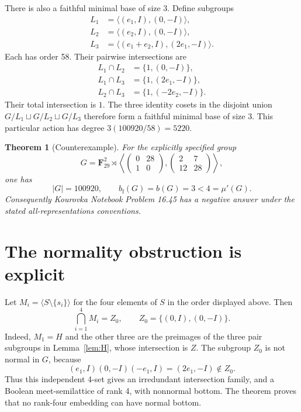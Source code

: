 \documentclass[11pt]{article}
\newtheorem{theorem}{Theorem}
\theoremstyle{remark}\newtheorem{remark}[theorem]{Remark}
\newcommand{\F}{\mathbf F}
\newcommand{\mup}{\mu'}
\newcommand{\bfth}{b_{\mathrm f}}
\begin{document}
There is also a faithful minimal base of size 3. Define subgroups
\[
\begin{split}
 L_1&=\langle(e_1,I),(0,-I)\rangle,\\
 L_2&=\langle(e_2,I),(0,-I)\rangle,\\
 L_3&=\langle(e_1+e_2,I),(2e_1,-I)\rangle.
\end{split}
\]
Each has order 58. Their pairwise intersections are
\[
\begin{split}
 L_1\cap L_2&=\{1,(0,-I)\},\\
 L_1\cap L_3&=\{1,(2e_1,-I)\},\\
 L_2\cap L_3&=\{1,(-2e_2,-I)\}.
\end{split}
\]
Their total intersection is $1$. The three identity cosets in the disjoint
union $G/L_1\sqcup G/L_2\sqcup G/L_3$ therefore form a faithful minimal base
of size 3. This particular action has degree $3(100920/58)=5220$.

\begin{theorem}[Counterexample]
For the explicitly specified group
\[
 G=\F_{29}^2\rtimes
 \left\langle
 \begin{pmatrix}0&28\\1&0\end{pmatrix},
 \begin{pmatrix}2&7\\12&28\end{pmatrix}
 \right\rangle,
\]
one has
\[
             |G|=100920,
 \qquad      \bfth(G)=b(G)=3<4=\mup(G).
\]
Consequently Kourovka Notebook Problem 16.45 has a negative answer under the
stated all-representations conventions.
\end{theorem}

\section{The normality obstruction is explicit}
Let $M_i=\langle S\setminus\{s_i\}\rangle$ for the four elements of $S$ in the
order displayed above. Then
\[
              \bigcap_{i=1}^4M_i=Z_0,
       \qquad Z_0=\{(0,I),(0,-I)\}.
\]
Indeed, $M_1=H$ and the other three are the preimages of the three pair
subgroups in Lemma~\ref{lem:H}, whose intersection is $Z$. The subgroup
$Z_0$ is not normal in $G$, because
\[
 (e_1,I)(0,-I)(-e_1,I)=(2e_1,-I)\notin Z_0.
\]
Thus this independent 4-set gives an irredundant intersection family, and a
Boolean meet-semilattice of rank 4, with nonnormal bottom. The theorem proves
that no rank-four embedding can have normal bottom.
\end{document}
